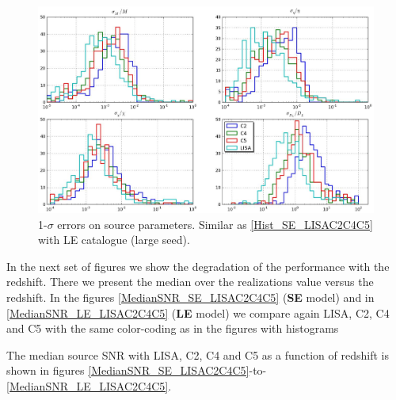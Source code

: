 \documentclass{iopart}
\begin{document}
\begin{figure}[H]
\center
   \includegraphics[width=1\textwidth]{FigSMBHPhenomAEI/Hist_LE_LISAC2C4C5.eps}
\caption{1-$\sigma$ errors on source parameters. Similar as \ref{Hist_SE_LISAC2C4C5} with LE catalogue (large seed).
\label{Hist_LE_LISAC2C4C5} } 
\end{figure}




In the next set of figures we show the degradation of the performance with the redshift. There we present the median over the 
realizations value versus the redshift. In the figures \ref{MedianSNR_SE_LISAC2C4C5} ({\bf SE} model) and in 
\ref{MedianSNR_LE_LISAC2C4C5} ({\bf LE} model) we compare again LISA, C2, C4 and C5 with the same color-coding as 
in the figures with histograms



The median source SNR with LISA, C2, C4 and C5 as a function of redshift is shown in figures \ref{MedianSNR_SE_LISAC2C4C5}-to-\ref{MedianSNR_LE_LISAC2C4C5}.

\end{document}
